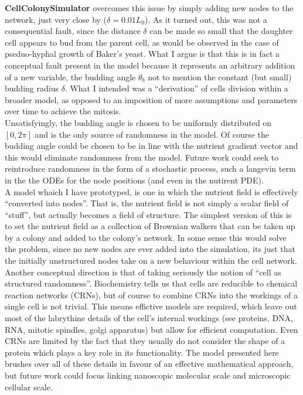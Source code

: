 \textbf{CellColonySimulator} overcomes this issue by simply 
adding new nodes to the network, just very close by ($\delta = 0.01 L_0$).
As it turned out, this was not a consequential fault,
since the distance $\delta$ can be made so small that 
the daughter cell appears to bud from the parent cell, as 
would be observed in the case of pseduo-hyphal growth of Baker's yeast.
What I argue is that this is in fact a conceptual fault present in the model
because it represents an arbitrary addition of a new variable,
the budding angle $\theta_{b}$ not to mention the constant (but small) budding radius 
$\delta$. What I intended  
was a ``derivation'' of cells division within a broader model,
as opposed to an imposition of more assumptions and parameters
over time to achieve the mitosis.
\\

Unsatisfyingly, the budding angle is chosen to be uniformly distributed on $[0, 2 \pi]$
and is the only source of randomness in the model. Of course the budding angle
could be chosen to be in line with the nutrient gradient vector and this would 
eliminate randomness from the model. Future work could seek to 
reintroduce randomness in the form of a stochastic process, 
such a langevin term in the the ODEs for the node positions (and even in the nutirent PDE).
\\

A model whaich I have prototyped, is one in which the nutrient field is 
effectively ``converted into nodes''. That is, the nutrient field is not simply
a scalar field of ``stuff'', but actually becomes a field of structure. The simplest
version of this is to set the nutrient field as a collection of Brownian walkers that 
can be taken up by a colony and added to the colony's network. In some sense this 
would solve the problem, since no new nodes are ever added into the simulation,
its just that the initially unstructured nodes take on a new behaviour within the cell network.
\\

Another conceptual direction is that of taking seriously the notion of 
``cell as structured randomness''. Biochemistry tells us that
cells are reducible to chemical reaction networks (CRNs), but of course to combine 
CRNs into the workings of a single cell is not trivial. This means effictive
models are required, which leave out most of the labrythine details of the cell's
internal workings (see proteins, DNA, RNA, mitotic spindles, golgi apparatus) but allow
for efficient computation. Even CRNs are limited by the fact that 
they usually do not consider the shape of a protein which plays 
a key role in its functionality. The model presented here brushes
over all of these details in favour of an effective mathematical approach, 
but future work could focus linking 
nanoscopic molecular scale and microscopic cellular scale.
\\

